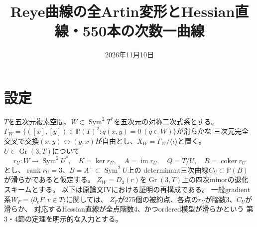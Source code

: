 \documentclass[11pt,a4paper]{ltjsarticle}
\title{Reye曲線の全Artin変形とHessian直線・550本の次数一曲線}
\author{}
\date{2026年11月10日}
\newcommand{\PP}{\mathbb P}
\newcommand{\Gr}{\operatorname{Gr}}
\newcommand{\Sym}{\operatorname{Sym}}
\begin{document}
\maketitle
\section{設定}
$T$を五次元複素空間、$W\subset\Sym^2T^*$を五次元の対称二次式系とする。
$\Gamma_W=\{([x],[y])\in\PP(T)^2:q(x,y)=0\ (q\in W)\}$が滑らかな
三次元完全交叉で交換$(x,y)\leftrightarrow(y,x)$が自由とし、$X_W=\Gamma_W/\langle\iota\rangle$と置く。
$U\in\Gr(3,T)$について
\[
r_U:W\longrightarrow\Sym^2U^*,\quad
K=\ker r_U,\quad A=\operatorname{im}r_U,\quad Q=T/U,\quad R=\operatorname{coker}r_U
\]
とし、$\operatorname{rank}r_U=3$、$B=A^\perp\subset\Sym^2U$上の
determinant三次曲線$C_U\subset\PP(B)$が滑らかであると仮定する。
$Z_W=D_3(r)$を$\Gr(3,T)$上の四次minorの退化スキームとする。
以下は原論文IVにおける証明の再構成である。
一般gradient系$W_F=\langle\partial_vF:v\in T\rangle$に関しては、
$Z_F$が275個の被約点、各点の$r_U$が階数3、$C_U$が滑らか、
対応するHessian直線が全点階数4、かつordered模型が滑らかという
第3・4節の定理を明示的な入力とする。
\end{document}
